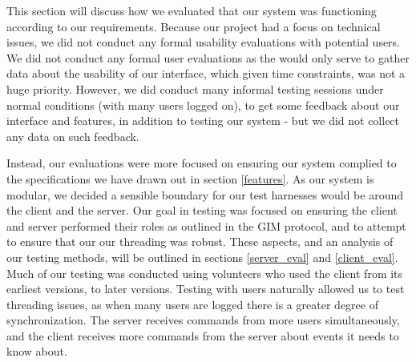 This section will discuss how we evaluated that our system was functioning according to our requirements. Because our project had a focus on technical issues, we did not conduct any formal usability evaluations with potential users. We did not conduct any formal user evaluations as the would only serve to gather data about the usability of our interface, which given time constraints, was not a huge priority. However, we did conduct many informal testing sessions under normal conditions (with many users logged on), to get some feedback about our interface and features, in addition to testing our system - but we did not collect any data on such feedback. 

Instead, our evaluations were more focused on ensuring our system complied to the specifications we have drawn out in section \ref{features}. As our system is modular, we decided a sensible boundary for our test harnesses would be around the client and the server. Our goal in testing was focused on ensuring the client and server performed their roles as outlined in the GIM protocol, and to attempt to ensure that our our threading was robust.  These aspects, and an analysis of our testing methods, will be outlined in sections \ref{server_eval} and \ref{client_eval}. Much of our testing was conducted using volunteers who used the client from its earliest versions, to later versions. Testing with users naturally allowed us to test threading issues, as when many users are logged there is a greater degree of synchronization. The server receives commands from more users simultaneously, and the client receives more commands from the server about events it needs to know about.

